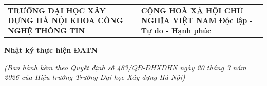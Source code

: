 \begin{center}{\singlespacing\renewcommand{\arraystretch}{1.2}
\begin{tabular}{>{\raggedright\arraybackslash}p{}>{\centering\arraybackslash}p{}}
\textbf{TRƯỜNG ĐẠI HỌC XÂY DỰNG HÀ NỘI} \newline \textbf{KHOA CÔNG NGHỆ THÔNG TIN} & \textbf{CỘNG HOÀ XÃ HỘI CHỦ NGHĨA VIỆT NAM} \newline \textbf{Độc lập - Tự do - Hạnh phúc} \\
\end{tabular}}\end{center}
\textbf{Nhật ký thực hiện ĐATN}

\textit{(Ban hành kèm theo Quyết định số 483/QĐ-ĐHXDHN ngày 20 tháng 3 năm 2026 của Hiệu trưởng Trường Đại học Xây dựng Hà Nội)}

